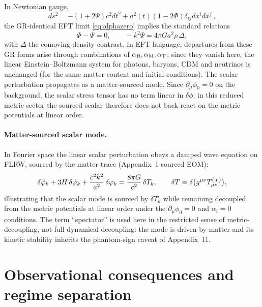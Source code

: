 \documentclass[11pt]{article}
\newcommand{\aB}{\alpha_{\rm B}}
\newcommand{\aM}{\alpha_{\rm M}}
\newcommand{\aT}{\alpha_{\rm T}}
\begin{document}
In Newtonian gauge,
\begin{equation}
ds^2 = -(1+2\Psi)c^2dt^2 + a^2(t)(1-2\Phi)\delta_{ij}dx^i dx^j\,,
\end{equation}
the GR-identical EFT limit \eqref{eq:alphazero} implies the standard relations
\begin{equation}
\Phi-\Psi = 0,
\qquad
-k^2\Psi = 4\pi G a^2 \rho\,\Delta,
\label{eq:poisson_app9}
\end{equation}
with $\Delta$ the comoving density contrast.
In EFT language, departures from these GR forms arise through combinations of
$\aB,\aM,\aT$; since they vanish here, the linear Einstein--Boltzmann system for
photons, baryons, CDM and neutrinos is unchanged (for the same matter content
and initial conditions). The scalar perturbation propagates as a matter-sourced
mode.  Since $\partial_\mu\phi_0=0$ on the background, the scalar stress tensor
has no term linear in $\delta\phi$; in this reduced metric sector the sourced
scalar therefore does not back-react on the metric potentials at linear order.

\paragraph{Matter-sourced scalar mode.}
In Fourier space the linear scalar perturbation obeys a damped wave equation on
FLRW, sourced by the matter trace (Appendix~1 sourced EOM):
\begin{equation}
\delta\ddot\phi_k + 3H\,\delta\dot\phi_k + \frac{c^2k^2}{a^2}\,\delta\phi_k
= \frac{8\pi G}{c^2}\,\delta T_k,\qquad \delta T\equiv \delta\bigl(g^{\mu\nu}T^{(\rm m)}_{\mu\nu}\bigr),
\label{eq:deltaphi_app9}
\end{equation}
illustrating that the scalar mode is sourced by $\delta T_k$ while remaining
decoupled from the metric potentials at linear order under the
$\partial_\mu\phi_0=0$ and $\alpha_i=0$ conditions. The
term ``spectator'' is used here in the restricted sense of metric-decoupling,
not full dynamical decoupling: the mode is driven by matter and its kinetic
stability inherits the phantom-sign caveat of Appendix~11.

\section{Observational consequences and regime separation}
\label{sec:obs}
\end{document}
